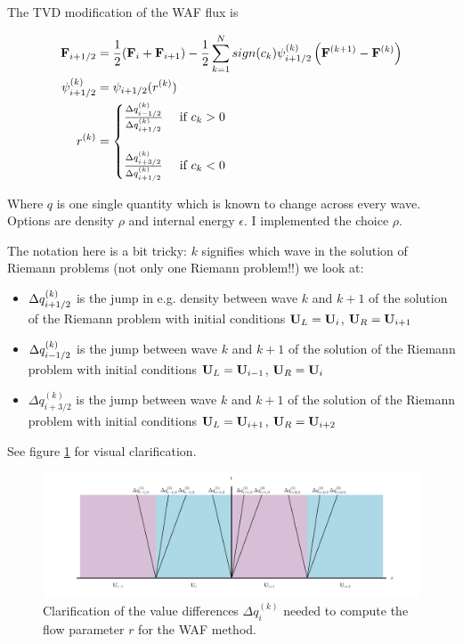 The TVD modification of the WAF flux is


\begin{align}
	\F_{i + \half} 
		&= \frac{1}{2} (\F_i + \F_{i+1}) - \frac{1}{2} \sum\limits_{k = 1}^{N} sign(c_k) \psi_{i+\half}^{(k)} \left (\F^{(k+1)} - \F^{(k)} \right) \\
	\psi_{i+\half}^{(k)}
		&= \psi_{i+\half}(r^{(k)}) \\
	r^{(k)} &=
		\begin{cases}
			\frac{\Delta q_{i-\half}^{(k)}}{\Delta q_{i+\half}^{(k)}}	& \text{ if } c_k > 0 \\[2em]
			\frac{\Delta q_{i+3/2}^{(k)}}{\Delta q_{i+\half}^{(k)}}	& \text{ if } c_k < 0 \\		
		\end{cases}
\end{align}

Where $q$ is one single quantity which is known to change across every wave.
Options are density $\rho$ and internal energy $\epsilon$.
I implemented the choice $\rho$.

The notation here is a bit tricky: $k$ signifies which wave in the solution of Riemann problems (not only one Riemann problem!!) we look at:

\begin{itemize}
	\item $\Delta q_{i+1/2}^{(k)}$ is the jump in e.g. density between wave $k$ and $k + 1$ of the solution of the Riemann problem with initial conditions $\mathbf{U}_L = \mathbf{U}_i$, $\mathbf{U}_R = \mathbf{U}_{i+1}$
	\item $\Delta q_{i-1/2}^{(k)}$ is the jump between wave $k$ and $k+1$ of the solution of the Riemann problem with initial conditions $\mathbf{U}_L = \mathbf{U}_{i-1}$, $\mathbf{U}_R = \mathbf{U}_{i}$
	\item $\Delta q_{i+3/2}^{(k)}$ is the jump between wave $k$ and $k+1$ of the solution of the Riemann problem with initial conditions $\mathbf{U}_L = \mathbf{U}_{i+1}$, $\mathbf{U}_R = \mathbf{U}_{i+2}$
\end{itemize}

See figure \ref{fig:WAF-delta-q} for visual clarification.



\begin{figure}[htpb]
	\centering
	\includegraphics[width=\textwidth]{figures/WAF-hydro-delta-q.pdf}%
	\caption{
		Clarification of the value differences $\Delta q _{i}^{(k)}$ needed to compute the flow parameter $r$ for the WAF method.
		\label{fig:WAF-delta-q}
	}
\end{figure}




